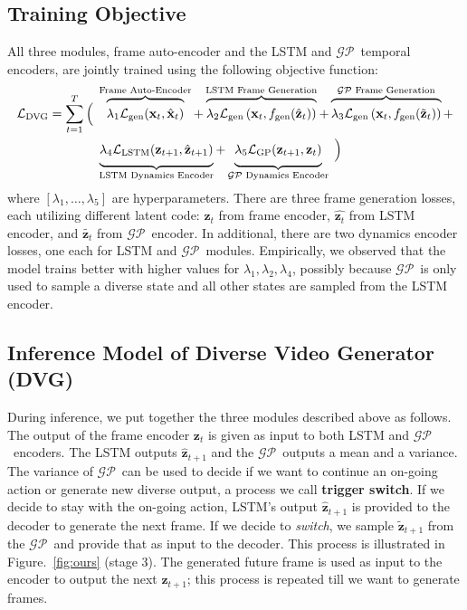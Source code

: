 \documentclass{article} \usepackage{iclr2021_conference,times}
\newcommand{\GP}{$\mathcal{GP}$}
\newcommand{\bx}{\mathbf{x}}
\newcommand{\bz}{\mathbf{z}}
\begin{document}
\vspace{-0.05in}
\subsection{Training Objective}
\vspace{-0.05in}
All three modules, frame auto-encoder and the LSTM and \GP\ temporal encoders, are jointly trained using the following objective function: 
\begin{align}
\begin{split}
\mathcal{L}_\text{DVG} = \sum_{t=1}^T \Big(\;
&\overbrace{\rule{0em}{2.5ex}\lambda_1\mathcal{L}_\text{gen}(\bx_t, \hat{\bx}_t)}^{\text{Frame Auto-Encoder}} +
 \overbrace{\rule{0em}{2.5ex}\lambda_2\mathcal{L}_{\text{gen}}\left(\bx_t, f_\text{gen}(\hat{\bz}_t)\right)}^{\text{LSTM Frame Generation}} +
\overbrace{\rule{0em}{2.5ex}\lambda_3\mathcal{L}_{\text{gen}}\left(\bx_t, f_\text{gen}(\tilde{\bz}_t)\right)}^{\text{\GP\ Frame Generation}} + \Big.\\
\Big.
& \underbrace{\lambda_4\mathcal{L}_\text{LSTM} (\mathbf{z}_{t+1}, \hat{\mathbf{z}}_{t+1})\rule[-1.5ex]{0em}{1.5ex}}_\text{LSTM Dynamics Encoder}
+\underbrace{\lambda_5 \mathcal{L}_\text{GP}(\mathbf{z}_{t+1}, {\mathbf{z}}_{t})\rule[-1.5ex]{0em}{1.5ex}}_\text{\GP\ Dynamics Encoder}
\; \Big)
\end{split}
\label{objective}
\end{align}
where $[\lambda_1,\dots,\lambda_5]$ are hyperparameters. There are three frame generation losses, each utilizing different latent code: $\bz_t$ from frame encoder, $\hat{\bz_t}$ from LSTM encoder, and $\tilde{\bz_t}$ from \GP\ encoder. In additional, there are two dynamics encoder losses, one each for LSTM and \GP\ modules.  
Empirically, we observed that the model trains better with higher values for $\lambda_1,\lambda_2,\lambda_4$, possibly because \GP\ is only used to sample a diverse state and all other states are sampled from the LSTM encoder.


\vspace{-0.05in}
\subsection{Inference Model of Diverse Video Generator (DVG)}
\vspace{-0.05in}
During inference, we put together the three modules described above as follows. The output of the frame encoder $\mathbf{z}_t$ is given as input to both LSTM and \GP\ encoders. The LSTM outputs $\hat{\mathbf{z}}_{t+1}$ and the \GP\ outputs a mean and a variance. The variance of \GP\ can be used to decide if we want to continue an on-going action or generate new diverse output, a process we call \textbf{trigger switch}. If we decide to stay with the on-going action, LSTM's output $\hat{\mathbf{z}}_{t+1}$ is provided to the decoder to generate the next frame. If we decide to \emph{switch}, we sample $\tilde{\mathbf{z}}_{t+1}$ from the \GP\ and provide that as input to the decoder. This process is illustrated in Figure.~\ref{fig:ours} (stage 3). The generated future frame is used as input to the encoder to output the next $\mathbf{z}_{t+1}$; this process is repeated till we want to generate frames.
\end{document}
